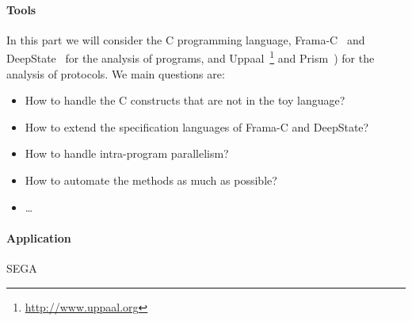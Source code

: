 \documentclass[11pt]{article}
\begin{document}
\paragraph{Tools} In this part we will consider the C programming
language, Frama-C~\cite{KKP2015:FAC} and DeepState~\cite{DEEPSTATE}
for the analysis of programs, and
Uppaal~\footnote{\url{http://www.uppaal.org}} and
Prism~\cite{KNP2011:CAV}) for the analysis of protocols. We main
questions are:
\begin{itemize}[itemsep=0pt]
\item How to handle the C constructs that are not in the toy language?
\item How to extend the specification languages of Frama-C and
  DeepState?
\item How to handle intra-program parallelism?
\item How to automate the methods as much as possible?
\item \ldots
\end{itemize}

\paragraph{Application} SEGA


%

\end{document}

